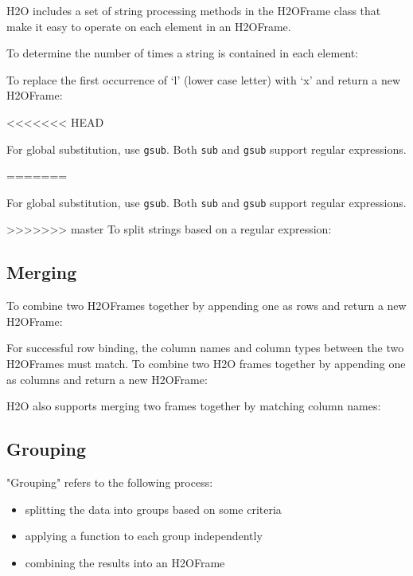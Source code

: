 {H2O includes a set of string processing methods in the H2OFrame class
that make it easy to operate on each element in an H2OFrame.  

To determine the number of times a string is contained in each element:


To replace the first occurrence of `l' (lower case letter) with `x' and return a new H2OFrame:

<<<<<<< HEAD

For global substitution, use {\texttt{gsub}}.  Both {\texttt{sub}} and {\texttt{gsub}} support regular expressions. 

=======

For global substitution, use {\texttt{gsub}}.  Both {\texttt{sub}} and {\texttt{gsub}} support regular expressions. 

>>>>>>> master
To split strings based on a regular expression:



\subsection{Merging}
To combine two H2OFrames together by appending one as rows and return a new H2OFrame:


For successful row binding, the column names and column types between the two H2OFrames must match. To combine two H2O frames together by appending one as columns and return a new H2OFrame:



\newpage
H2O also supports merging two frames together by matching column names:


\subsection{Grouping}

"Grouping" refers to the following process:

\begin{itemize}
\item splitting the data into groups based on some criteria 
\item applying a function to each group independently
\item combining the results into an H2OFrame
\end{itemize}

}
